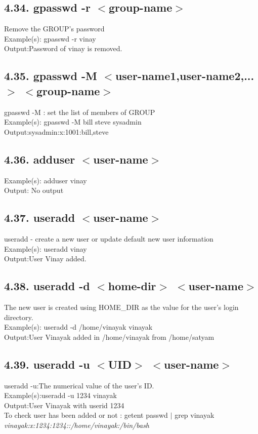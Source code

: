 \documentclass[11pt,a4]{article}
\begin{document}
\begin{enumerate}
\subsection*{4.34. gpasswd -r $<$group-name$>$}
Remove the GROUP's password\\
Example(s): gpasswd -r vinay\\
Output:Password of vinay is removed.
\subsection*{4.35. gpasswd -M $<$user-name1,user-name2,...$>$ $<$group-name$>$}
gpasswd -M : set the list of members of GROUP\\
Example(s): gpasswd -M bill steve sysadmin\\
Output:sysadmin:x:1001:bill,steve

\subsection*{4.36. adduser $<$user-name$>$}
Example(s): adduser vinay\\
Output: No output
\subsection*{4.37. useradd $<$user-name$>$}
useradd - create a new user or update default new user information\\
Example(s): useradd vinay\\
Output:User Vinay added.
\subsection*{4.38. useradd -d $<$home-dir$>$ $<$user-name$>$}
 The new user is created using HOME\_DIR as the value for the
user's login directory.\\
Example(s): useradd -d /home/vinayak vinayak\\
Output:User Vinayak added in /home/vinayak from /home/satyam
\subsection*{4.39. useradd -u $<$UID$>$ $<$user-name$>$}
useradd -u:The numerical value of the user's ID.\\
Example(s):useradd -u 1234 vinayak\\
Output:User Vinayak with userid 1234\\
To check user has been added or not : getent passwd $|$ grep  vinayak\\
\textit{vinayak:x:1234:1234::/home/vinayak:/bin/bash}

\end{enumerate}
\end{document}

